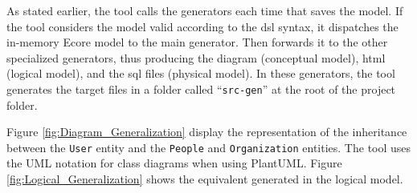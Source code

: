 As stated earlier, the tool calls the generators each time that saves the model.
If the tool considers the model valid according to the \ac{dsl} syntax, it dispatches the in-memory Ecore model to the main generator. Then forwards it to the other specialized generators, thus producing the diagram (conceptual model), \ac{html} (logical model), and the \ac{sql} files (physical model).
In these generators, the tool generates the target files in a folder called ``\texttt{src-gen}'' at the root of the project folder.


Figure \ref{fig:Diagram_Generalization} display the representation of the inheritance between the \texttt{User} entity and the \texttt{People} and \texttt{Organization} entities.
The tool uses the UML notation for class diagrams when using PlantUML.
Figure \ref{fig:Logical_Generalization} shows the equivalent generated in the logical model.

